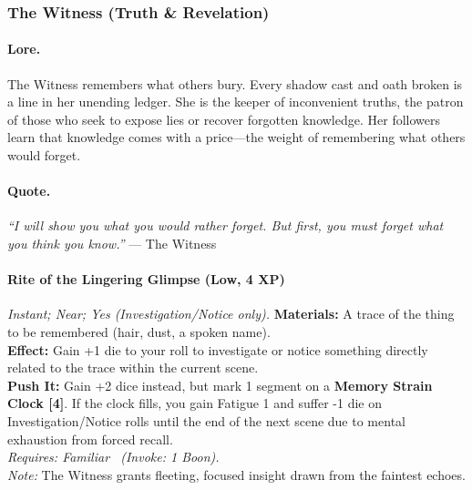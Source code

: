 
\subsubsection{The Witness (Truth & Revelation)}

\paragraph{Lore.}
The Witness remembers what others bury. Every shadow cast and oath broken is a line in her unending ledger. She is the keeper of inconvenient truths, the patron of those who seek to expose lies or recover forgotten knowledge. Her followers learn that knowledge comes with a price—the weight of remembering what others would forget.

\paragraph{Quote.}
\emph{``I will show you what you would rather forget. But first, you must forget what you think you know.''} — The Witness


\paragraph{Rite of the Lingering Glimpse (Low, 4 XP)} \emph{Instant; Near; Yes (Investigation/Notice only).}
\textbf{Materials:} A trace of the thing to be remembered (hair, dust, a spoken name). \\
\textbf{Effect:} Gain +1 die to your roll to investigate or notice something directly related to the trace within the current scene. \\
\textbf{Push It:} Gain +2 dice instead, but mark 1 segment on a \textbf{Memory Strain Clock [4]}. If the clock fills, you gain Fatigue 1 and suffer -1 die on Investigation/Notice rolls until the end of the next scene due to mental exhaustion from forced recall. \\
\emph{Requires: Familiar \ (\textit{Invoke:} 1 Boon).} \\
\emph{Note:} The Witness grants fleeting, focused insight drawn from the faintest echoes. %

